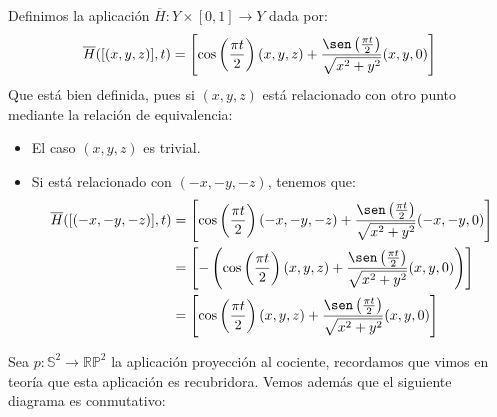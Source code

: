 \documentclass[12pt]{article}
\begin{document}
\begin{ejercicio}
\begin{enumerate}[label=\alph*)]
                    Definimos la aplicación $\overline{H}:Y\times [0,1]\to Y$ dada por:
                    \begin{equation*}
                        \overline{H}([(x,y,z)],t) = \left[\cos\left(\frac{\pi t}{2}\right)(x,y,z) + \frac{\sen\left(\frac{\pi t}{2}\right)}{\sqrt{x^2+y^2}}(x,y,0)\right]
                    \end{equation*}
                    Que está bien definida, pues si $(x,y,z)$ está relacionado con otro punto mediante la relación de equivalencia:
                    \begin{itemize}
                        \item El caso $(x,y,z)$ es trivial.
                        \item Si está relacionado con $(-x,-y,-z)$, tenemos que:
                            \begin{align*}
                                \overline{H}([(-x,-y,-z)],t) &=  \left[\cos\left(\frac{\pi t}{2}\right)(-x,-y,-z) + \frac{\sen\left(\frac{\pi t}{2}\right)}{\sqrt{x^2+y^2}}(-x,-y,0)\right] \\
                                                             &=  \left[-\left(\cos\left(\frac{\pi t}{2}\right)(x,y,z) + \frac{\sen\left(\frac{\pi t}{2}\right)}{\sqrt{x^2+y^2}}(x,y,0)\right)\right] \\
                                                             &=  \left[\cos\left(\frac{\pi t}{2}\right)(x,y,z) + \frac{\sen\left(\frac{\pi t}{2}\right)}{\sqrt{x^2+y^2}}(x,y,0)\right]
                            \end{align*}
                    \end{itemize}
                    Sea $p:\mathbb{S}^2\to \mathbb{R}\mathbb{P}^2$ la aplicación proyección al cociente, recordamos que vimos en teoría que esta aplicación es recubridora. Vemos además que el siguiente diagrama es conmutativo:
                    \begin{figure}[H]
                        \centering
                    \end{figure}

\end{enumerate}
\end{ejercicio}
\end{document}
